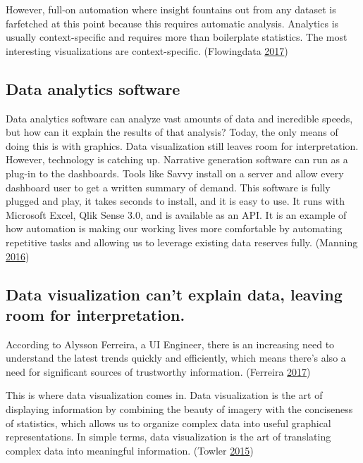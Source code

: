 \documentclass[]{book}
\begin{document}
However, full-on automation where insight fountains out from any dataset is farfetched at this point because this requires automatic analysis. Analytics is usually context-specific and requires more than boilerplate statistics. The most interesting visualizations are context-specific. (Flowingdata \protect\hyperlink{ref-auto_viz}{2017})

\hypertarget{data-analytics-software}{%
\subsection{Data analytics software}\label{data-analytics-software}}

Data analytics software can analyze vast amounts of data and incredible speeds, but how can it explain the results of that analysis? Today, the only means of doing this is with graphics. Data visualization still leaves room for interpretation. However, technology is catching up. Narrative generation software can run as a plug-in to the dashboards. Tools like Savvy install on a server and allow every dashboard user to get a written summary of demand. This software is fully plugged and play, it takes seconds to install, and it is easy to use. It runs with Microsoft Excel, Qlik Sense 3.0, and is available as an API. It is an example of how automation is making our working lives more comfortable by automating repetitive tasks and allowing us to leverage existing data reserves fully. (Manning \protect\hyperlink{ref-work_place}{2016})

\hypertarget{data-visualization-cant-explain-data-leaving-room-for-interpretation.}{%
\subsection{Data visualization can't explain data, leaving room for interpretation.}\label{data-visualization-cant-explain-data-leaving-room-for-interpretation.}}

According to Alysson Ferreira, a UI Engineer, there is an increasing need to understand the latest trends quickly and efficiently, which means there's also a need for significant sources of trustworthy information. (Ferreira \protect\hyperlink{ref-UI_engineer}{2017})

This is where data visualization comes in. Data visualization is the art of displaying information by combining the beauty of imagery with the conciseness of statistics, which allows us to organize complex data into useful graphical representations. In simple terms, data visualization is the art of translating complex data into meaningful information. (Towler \protect\hyperlink{ref-future_viz}{2015})
\end{document}

